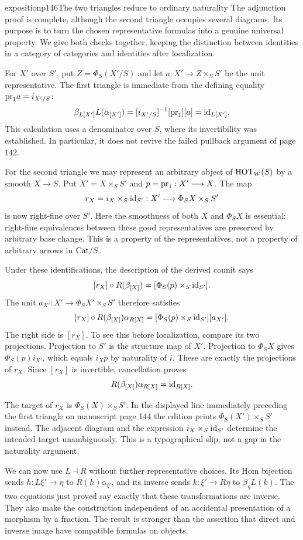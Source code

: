 \begin{dcomment}{exposition}{p146}{The two triangles reduce to ordinary naturality}
The adjunction proof is complete, although the second triangle occupies several diagrams. Its purpose is to turn the chosen representative formulas into a genuine universal property. We give both checks together, keeping the distinction between identities in a category of categories and identities after localization.

For $X'$ over $S'$, put $Z=\Phi_S(X'/S)$ and let $a:X'\longrightarrow Z\times_SS'$ be the unit representative. The first triangle is immediate from the defining equality $\mathrm{pr}_1a=i_{X'/S}$:
\[
 \beta_{L[X']}L(\alpha_{[X']})
 =[i_{X'/S}]^{-1}[\mathrm{pr}_1][a]=\mathrm{id}_{L[X']}.
\]
This calculation uses a denominator over $S$, where its invertibility was established. In particular, it does not revive the failed pullback argument of page 142.

For the second triangle we may represent an arbitrary object of $\mathrm{HOT}_W(S)$ by a smooth $X\longrightarrow S$. Put $X'=X\times_SS'$ and $p=\mathrm{pr}_1:X'\longrightarrow X$. The map
\[
 r_X=i_X\times_S\mathrm{id}_{S'}:
 X'\longrightarrow\Phi_SX\times_SS'
\]
is now right-fine over $S'$. Here the smoothness of both $X$ and $\Phi_SX$ is essential: right-fine equivalences between these good representatives are preserved by arbitrary base change. This is a property of the representatives, not a property of arbitrary arrows in $\mathrm{Cat}/S$.

Under these identifications, the description of the derived counit says
\[
 [r_X]\circ R(\beta_{[X]})
 =[\Phi_S(p)\times_S\mathrm{id}_{S'}].
\]
The unit $a_{X'}:X'\longrightarrow\Phi_SX'\times_SS'$ therefore satisfies
\[
 [r_X]\circ R(\beta_{[X]})\alpha_{R[X]}
 =[\Phi_S(p)\times_S\mathrm{id}_{S'}][a_{X'}].
\]
The right side is $[r_X]$. To see this before localization, compare its two projections. Projection to $S'$ is the structure map of $X'$. Projection to $\Phi_SX$ gives $\Phi_S(p)i_{X'}$, which equals $i_Xp$ by naturality of $i$. These are exactly the projections of $r_X$. Since $[r_X]$ is invertible, cancellation proves
\[
 R(\beta_{[X]})\alpha_{R[X]}=\mathrm{id}_{R[X]}.
\]

The target of $r_X$ is $\Phi_S(X)\times_SS'$. In the displayed line immediately preceding the first triangle on manuscript page 144 the edition prints $\Phi_S(X')\times_SS'$ instead. The adjacent diagram and the expression $i_X\times_S\mathrm{id}_{S'}$ determine the intended target unambiguously. This is a typographical slip, not a gap in the naturality argument.

We can now use $L\dashv R$ without further representative choices. Its Hom bijection sends $h:L\xi'\longrightarrow\eta$ to $R(h)\alpha_{\xi'}$, and its inverse sends $k:\xi'\longrightarrow R\eta$ to $\beta_\eta L(k)$. The two equations just proved say exactly that these transformations are inverse. They also make the construction independent of an accidental presentation of a morphism by a fraction. The result is stronger than the assertion that direct and inverse image have compatible formulas on objects.
\end{dcomment}


